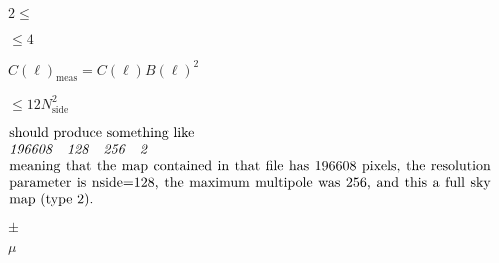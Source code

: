\documentclass[12pt,twoside]{article}
\providecommand{\facname}{}%
\providecommand{\FACNAME}{}%
\providecommand{\projfullname}{}
\def\lthtmlcheckvsize{\ifdim\ht\sizebox<\vsize 
  \ifdim\wd\sizebox<\hsize\expandafter\hfill\fi \expandafter\vfill
  \else\expandafter\vss\fi}%
\begin{document}
\renewcommand{\facname}{{gaussbeam}}

\renewcommand{\FACNAME}{{GAUSSBEAM}}

\renewcommand{\l}{{$\ell$\  }}
{\newpage\clearpage
{}%
$2 \le$%
\lthtmlindisplaymathZ
\lthtmlcheckvsize\clearpage}

{\newpage\clearpage
{}%
$\le 4$%
\lthtmlindisplaymathZ
\lthtmlcheckvsize\clearpage}

{\newpage\clearpage
{}%
$C(\ell)_{\mathrm{meas}} = C(\ell)
B(\ell)^2$%
\lthtmlindisplaymathZ
\lthtmlcheckvsize\clearpage}


\renewcommand{\facname}{{getdisc\_ring }}

\renewcommand{\FACNAME}{{GETDISC\_RING }}

\renewcommand{\facname}{{getsize\_fits }}

\renewcommand{\FACNAME}{{GETSIZE\_FITS }}
{\newpage\clearpage
{}%
$\le 12N_{\mathrm{side}}^2$%
\lthtmlindisplaymathZ
\lthtmlcheckvsize\clearpage}

{\newpage\clearpage
{}%
$\textstyle \parbox{\hsize}{ should produce something like \\
   {\em 196608 \ \        128 \ \         256  \ \      2} \\
meaning that the map contained in that file has 196608 pixels, the resolution parameter is
nside=128, the maximum multipole was 256, and this a full sky map
(type 2).
}$%
\lthtmlindisplaymathZ
\lthtmlcheckvsize\clearpage}


\renewcommand{\projfullname}{a gnomic (or gnomonic)}
{\newpage\clearpage
{}%
$\pm$%
\lthtmlindisplaymathZ
\lthtmlcheckvsize\clearpage}

{\newpage\clearpage
{}%
$\mu$%
\lthtmlindisplaymathZ
\lthtmlcheckvsize\clearpage}


\renewcommand{\facname}{{healpixwindow}}

\renewcommand{\FACNAME}{{HEALPIXWINDOW}}
\end{document}
